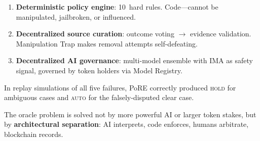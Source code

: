 \documentclass[11pt,a4paper,twocolumn]{article}
\begin{document}
\begin{enumerate}[nosep,leftmargin=*]
    \item \textbf{Deterministic policy engine}: 10~hard rules. Code---cannot be manipulated, jailbroken, or influenced.
    \item \textbf{Decentralized source curation}: outcome voting $\to$ evidence validation. Manipulation Trap makes removal attempts self-defeating.
    \item \textbf{Decentralized AI governance}: multi-model ensemble with IMA as safety signal, governed by token holders via Model Registry.
\end{enumerate}

In replay simulations of all five failures, PoRE correctly produced \textsc{hold} for ambiguous cases and \textsc{auto} for the falsely-disputed clear case.

The oracle problem is solved not by more powerful AI or larger token stakes, but by \textbf{architectural separation}: AI interprets, code enforces, humans arbitrate, blockchain records.
\end{document}
